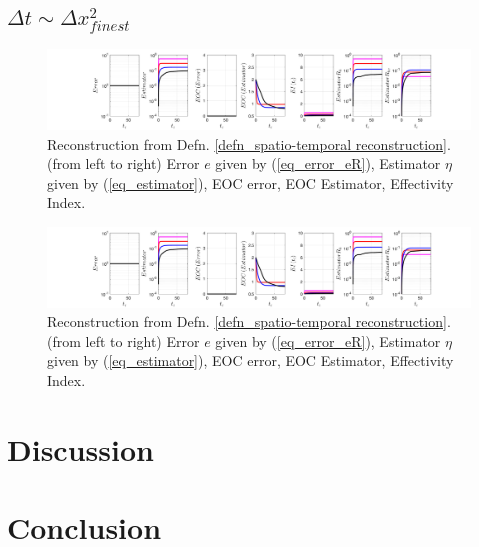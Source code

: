 \documentclass[12pt,a4paper]{article}
\numberwithin{equation}{section}
\theoremstyle{definition}
\begin{document}
\subsection*{$\Delta t \sim \Delta x_{finest}^2$}
\begin{figure}[H]
	\hspace{-3cm}
	\includegraphics[scale=0.55]{../figures/fig_SHW_RK1_LXF_rec1_pow_twoplots_1x5_shw_periodic}	
	\caption{Reconstruction from Defn. \ref{defn_spatio-temporal reconstruction}. (from left to right) Error $e$ given by (\ref{eq_error_eR}), Estimator $\eta$ given by (\ref{eq_estimator}), EOC error, EOC Estimator, Effectivity Index.}
	\label{fig_all_RK1_LXF_rec1_pow_two}
\end{figure}

\begin{figure}[H]
	\hspace{-3cm}
	\includegraphics[scale=0.55]{../figures/fig_SHW_RK3_LXF_rec3_pow_twoplots_1x5_shw_periodic}	
	\caption{Reconstruction from Defn. \ref{defn_spatio-temporal reconstruction}. (from left to right) Error $e$ given by (\ref{eq_error_eR}), Estimator $\eta$ given by (\ref{eq_estimator}), EOC error, EOC Estimator, Effectivity Index.}
	\label{fig_all_RK3_LXF_rec3_pow_two}
\end{figure}




\section{Discussion}\label{sec:discussion}

\section{Conclusion}




\end{document}
